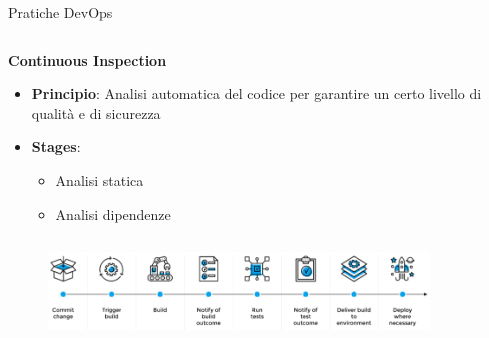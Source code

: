 \begin{frame}{Pratiche DevOps}
\begin{columns}[onlytextwidth,t]
\begin{column}{0.33\textwidth}
            \textbf{Continuous Inspection}
            \vspace{2mm}
            \begin{itemize}
                \item \textbf{Principio}: Analisi automatica del codice per garantire un certo livello di qualità e di sicurezza
                \vspace{2mm}
                \item \textbf{Stages}:
                \begin{itemize}
                    \item Analisi statica
                    \item Analisi dipendenze
                \end{itemize}
            \end{itemize}
        
        \end{column}
    \end{columns}

    \vspace{2mm}

    \begin{figure}[H]
        \includegraphics[width=0.9\textwidth]{img/cicd.png}
    \end{figure}

\end{frame}

